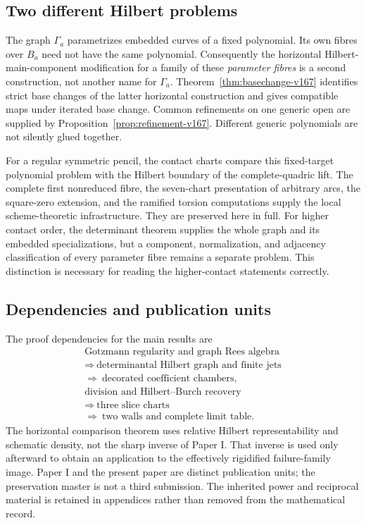 \documentclass[11pt,reqno]{amsart}
\numberwithin{equation}{section}
\theoremstyle{definition}\newtheorem{definition}[theorem]{Definition}
\theoremstyle{remark}\newtheorem{remark}[theorem]{Remark}
\begin{document}
\subsection{Two different Hilbert problems}
The graph $\Gamma_a$ parametrizes embedded curves of a fixed
polynomial. Its own fibres over $B_a$ need not have the same
polynomial. Consequently the horizontal Hilbert-main-component
modification for a family of these \emph{parameter fibres} is a
second construction, not another name for $\Gamma_a$.
Theorem~\ref{thm:basechange-v167} identifies strict base changes
of the latter horizontal construction and gives compatible maps
under iterated base change. Common refinements on one generic
open are supplied by Proposition~\ref{prop:refinement-v167}.
Different generic polynomials are not silently glued together.

For a regular symmetric pencil, the contact charts compare this
fixed-target polynomial problem with the Hilbert boundary of the
complete-quadric lift. The complete first nonreduced fibre,
the seven-chart presentation of arbitrary arcs, the square-zero
extension, and the ramified torsion computations supply the local
scheme-theoretic infrastructure. They are preserved here in full.
For higher contact order, the determinant theorem supplies the
whole graph and its embedded specializations, but a component,
normalization, and adjacency classification of every parameter
fibre remains a separate problem. This distinction is necessary
for reading the higher-contact statements correctly.

\subsection{Dependencies and publication units}
The proof dependencies for the main results are
\[
 \begin{gathered}
 \text{Gotzmann regularity and graph Rees algebra}\\
 \Longrightarrow\ \text{determinantal Hilbert graph and finite jets}\\
 \Longrightarrow\ \text{decorated coefficient chambers},\\[3pt]
 \text{division and Hilbert--Burch recovery}\\
 \Longrightarrow\ \text{three slice charts}\\
 \Longrightarrow\ \text{two walls and complete limit table}.
 \end{gathered}
\]
The horizontal comparison theorem uses relative Hilbert
representability and schematic density, not the sharp inverse of
Paper I. That inverse is used only afterward to obtain an
application to the effectively rigidified failure-family image.
Paper I and the present paper are distinct publication units;
the preservation master is not a third submission. The inherited
power and reciprocal material is retained in appendices rather
than removed from the mathematical record.
\end{document}
